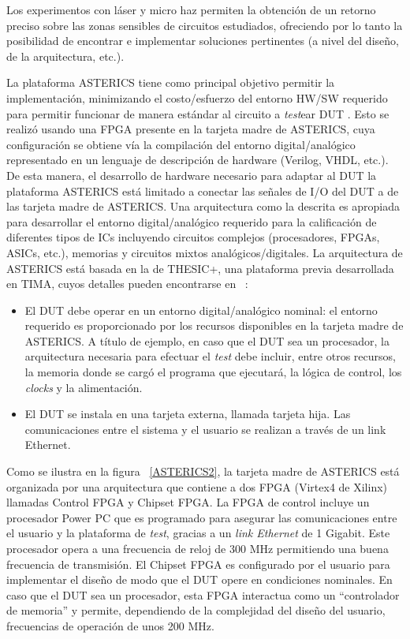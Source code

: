 \documentclass[a4paper,openright,12pt]{report}
\begin{document}
Los experimentos con láser y micro haz permiten la obtención de un retorno preciso sobre las zonas sensibles de circuitos estudiados, ofreciendo por lo tanto la posibilidad de encontrar e implementar soluciones pertinentes (a nivel del diseño, de la arquitectura, etc.). 


La plataforma ASTERICS tiene como principal objetivo permitir la implementación, minimizando el costo/esfuerzo del entorno HW/SW requerido para permitir funcionar de manera estándar al circuito a \textit{test}ear DUT . Esto se realizó usando una FPGA presente en la tarjeta madre de ASTERICS,  cuya configuración se obtiene vía la compilación del entorno digital/analógico representado en un lenguaje de descripción de hardware (Verilog, VHDL, etc.). De esta manera, el desarrollo de hardware necesario para adaptar al DUT la plataforma ASTERICS está limitado a conectar las señales de  I/O  del DUT a de las tarjeta madre de ASTERICS. Una  arquitectura como la descrita  es apropiada para desarrollar el entorno digital/analógico requerido para la calificación de diferentes tipos de ICs incluyendo circuitos complejos (procesadores, FPGAs, ASICs, etc.), memorias y circuitos mixtos analógicos/digitales.
La arquitectura de ASTERICS está basada en la de THESIC+, una plataforma previa desarrollada en TIMA, cuyos detalles pueden encontrarse en  ~\cite{faure2002thesic+}:  
\begin{itemize}
\item	El DUT debe operar en un entorno digital/analógico nominal: el entorno requerido es proporcionado por los recursos disponibles en la tarjeta madre de ASTERICS. A título de ejemplo, en caso que el DUT sea un procesador, la arquitectura necesaria para efectuar el \textit{test} debe incluir, entre otros recursos, la memoria donde se cargó el programa que ejecutará, la lógica de control, los \textit{clocks} y la alimentación.
\item	El DUT se instala en una tarjeta externa, llamada tarjeta hija. Las comunicaciones entre el sistema y el usuario se realizan a través de un link Ethernet.

\end{itemize}

Como se ilustra en la figura ~\ref{ASTERICS2}, la tarjeta madre de ASTERICS está organizada por una arquitectura que contiene a dos FPGA (Virtex4 de Xilinx) llamadas Control FPGA y Chipset FPGA. La FPGA de control incluye un procesador Power PC que es programado para asegurar las comunicaciones entre el usuario y la plataforma de \textit{test}, gracias a un \textit{link Ethernet} de 1 Gigabit. Este procesador opera a una frecuencia de reloj de 300 MHz permitiendo una buena frecuencia de transmisión. El Chipset FPGA es configurado por el usuario para implementar el diseño de modo que el DUT opere en condiciones nominales.  En caso que el DUT sea un procesador, esta FPGA interactua como un ``controlador de memoria'' y permite, dependiendo de la complejidad del diseño del usuario, frecuencias de operación de unos 200 MHz. 
\end{document}

